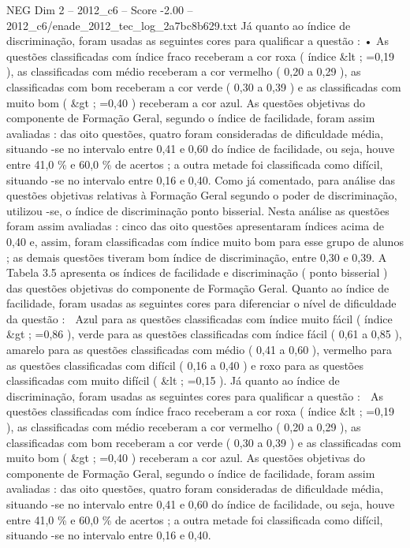 \begin{textsample}{NEG Dim 2 – 2012\_c6 – Score -2.00 – 2012\_c6/enade\_2012\_tec\_log\_2a7bc8b629.txt}
Já quanto ao índice de discriminação, foram usadas as seguintes cores para qualificar a questão : • As questões classificadas com índice fraco receberam a cor roxa ( índice \&lt ; =0,19 ), as classificadas com médio receberam a cor vermelho ( 0,20 a 0,29 ), as classificadas com bom receberam a cor verde ( 0,30 a 0,39 ) e as classificadas com muito bom ( \&gt ; =0,40 ) receberam a cor azul.
As questões objetivas do componente de Formação Geral, segundo o índice de facilidade, foram assim avaliadas : das oito questões, quatro foram consideradas de dificuldade média, situando -se no intervalo entre 0,41 e 0,60 do índice de facilidade, ou seja, houve entre 41,0 \% e 60,0 \% de acertos ; a outra metade foi classificada como difícil, situando -se no intervalo entre 0,16 e 0,40.
Como já comentado, para análise das questões objetivas relativas à Formação Geral segundo o poder de discriminação, utilizou -se, o índice de discriminação ponto bisserial.
Nesta análise as questões foram assim avaliadas : cinco das oito questões apresentaram índices acima de 0,40 e, assim, foram classificadas com índice muito bom para esse grupo de alunos ; as demais questões tiveram bom índice de discriminação, entre 0,30 e 0,39.
A Tabela 3.5 apresenta os índices de facilidade e discriminação ( ponto bisserial ) das questões objetivas do componente de Formação Geral.
Quanto ao índice de facilidade, foram usadas as seguintes cores para diferenciar o nível de dificuldade da questão :  Azul para as questões classificadas com índice muito fácil ( índice \&gt ; =0,86 ), verde para as questões classificadas com índice fácil ( 0,61 a 0,85 ), amarelo para as questões classificadas com médio ( 0,41 a 0,60 ), vermelho para as questões classificadas com difícil ( 0,16 a 0,40 ) e roxo para as questões classificadas com muito difícil ( \&lt ; =0,15 ).
Já quanto ao índice de discriminação, foram usadas as seguintes cores para qualificar a questão :  As questões classificadas com índice fraco receberam a cor roxa ( índice \&lt ; =0,19 ), as classificadas com médio receberam a cor vermelho ( 0,20 a 0,29 ), as classificadas com bom receberam a cor verde ( 0,30 a 0,39 ) e as classificadas com muito bom ( \&gt ; =0,40 ) receberam a cor azul.
As questões objetivas do componente de Formação Geral, segundo o índice de facilidade, foram assim avaliadas : das oito questões, quatro foram consideradas de dificuldade média, situando -se no intervalo entre 0,41 e 0,60 do índice de facilidade, ou seja, houve entre 41,0 \% e 60,0 \% de acertos ; a outra metade foi classificada como difícil, situando -se no intervalo entre 0,16 e 0,40.

\end{textsample}
